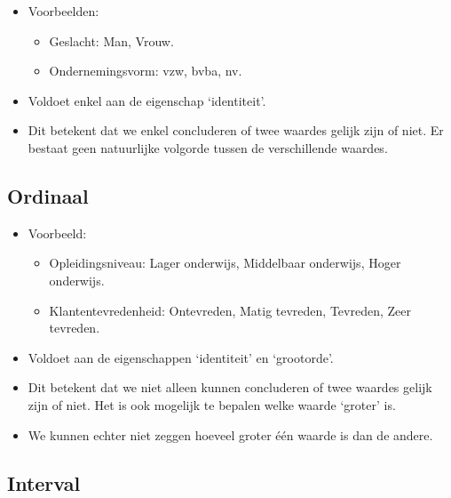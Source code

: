 \documentclass[]{memoir}
\providecommand{\tightlist}{%
  \setlength{\itemsep}{0pt}\setlength{\parskip}{0pt}}
\begin{document}
\begin{itemize}
\tightlist
\item
  Voorbeelden:

  \begin{itemize}
  \tightlist
  \item
    Geslacht: Man, Vrouw.
  \item
    Ondernemingsvorm: vzw, bvba, nv.
  \end{itemize}
\item
  Voldoet enkel aan de eigenschap `identiteit'.
\item
  Dit betekent dat we enkel concluderen of twee waardes gelijk zijn of niet. Er bestaat geen natuurlijke volgorde tussen de verschillende waardes.
\end{itemize}

\hypertarget{ordinaal}{%
\subsection*{Ordinaal}\label{ordinaal}}

\begin{itemize}
\tightlist
\item
  Voorbeeld:

  \begin{itemize}
  \tightlist
  \item
    Opleidingsniveau: Lager onderwijs, Middelbaar onderwijs, Hoger onderwijs.
  \item
    Klantentevredenheid: Ontevreden, Matig tevreden, Tevreden, Zeer tevreden.
  \end{itemize}
\item
  Voldoet aan de eigenschappen `identiteit' en `grootorde'.
\item
  Dit betekent dat we niet alleen kunnen concluderen of twee waardes gelijk zijn of niet. Het is ook mogelijk te bepalen welke waarde `groter' is.
\item
  We kunnen echter niet zeggen hoeveel groter één waarde is dan de andere.
\end{itemize}

\hypertarget{interval}{%
\subsection*{Interval}\label{interval}}
\end{document}

